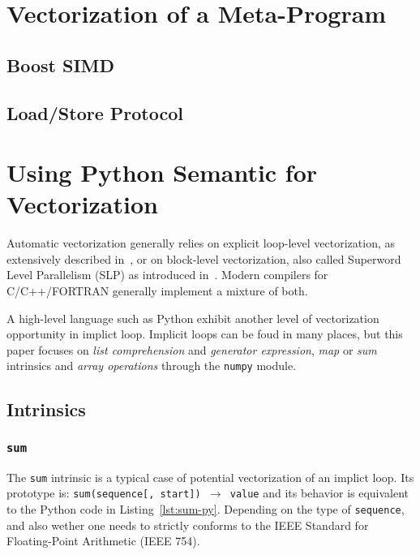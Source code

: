\documentclass[preprint]{sigplanconf}
\begin{document}
\section{Vectorization of a Meta-Program}
\label{sec:meta-vectorization}

\subsection{Boost SIMD}

\subsection{Load/Store Protocol}


\section{Using Python Semantic for Vectorization}
\label{sec:python-semantic}

Automatic vectorization generally relies on explicit loop-level vectorization, as
extensively described in~\cite{bik04}, or on block-level vectorization, also
called Superword Level Parallelism (SLP) as introduced in~\cite{larsen00}.
Modern compilers for C/C++/FORTRAN generally implement a mixture of both.

A high-level language such as Python exhibit another level of vectorization
opportunity in implict loop. Implicit loops can be foud in many places, but
this paper focuses on \emph{list comprehension} and \emph{generator
expression}, \emph{map} or \emph{sum} intrinsics and \emph{array operations}
through the \texttt{numpy} module.

\subsection{Intrinsics}

\subsubsection{\texttt{sum}}

The \texttt{sum} intrinsic is a typical case of potential vectorization of an
implict loop. Its prototype is: \texttt{sum(sequence[, start]) $\rightarrow$
value} and its behavior is equivalent to the Python code in
Listing~\ref{lst:sum-py}. Depending on the type of \texttt{sequence}, and also
wether one needs to strictly conforms to the IEEE Standard for Floating-Point
Arithmetic (IEEE 754).
\end{document}
